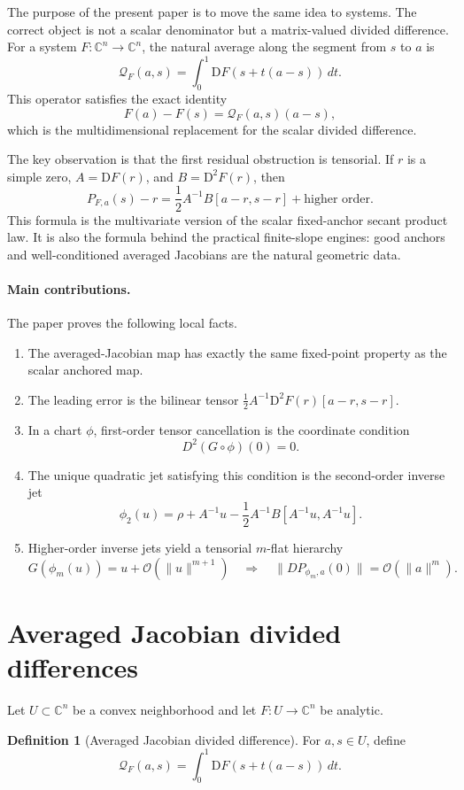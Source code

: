 \documentclass[11pt]{article}
\theoremstyle{definition}
\newtheorem{definition}[theorem]{Definition}
\newcommand{\C}{\mathbb C}
\newcommand{\D}{\mathrm D}
\newcommand{\Q}{\mathcal Q}
\newcommand{\Oterm}{\mathcal O}
\begin{document}
The purpose of the present paper is to move the same idea to systems. The correct object is not a scalar denominator but a matrix-valued divided difference. For a system $F:\C^n\to\C^n$, the natural average along the segment from $s$ to $a$ is
\[
\Q_F(a,s)=\int_0^1 \D F(s+t(a-s))\,dt.
\]
This operator satisfies the exact identity
\[
F(a)-F(s)=\Q_F(a,s)(a-s),
\]
which is the multidimensional replacement for the scalar divided difference.

The key observation is that the first residual obstruction is tensorial. If $r$ is a simple zero, $A=\D F(r)$, and $B=\D^2F(r)$, then
\[
P_{F,a}(s)-r=\frac12 A^{-1}B[a-r,s-r]+\text{higher order}.
\]
This formula is the multivariate version of the scalar fixed-anchor secant product law. It is also the formula behind the practical finite-slope engines: good anchors and well-conditioned averaged Jacobians are the natural geometric data.

\paragraph{Main contributions.}
The paper proves the following local facts.
\begin{enumerate}[label=(\roman*)]
\item The averaged-Jacobian map has exactly the same fixed-point property as the scalar anchored map.
\item The leading error is the bilinear tensor $\frac12 A^{-1}\D^2F(r)[a-r,s-r]$.
\item In a chart $\phi$, first-order tensor cancellation is the coordinate condition
\[
D^2(G\circ\phi)(0)=0.
\]
\item The unique quadratic jet satisfying this condition is the second-order inverse jet
\[
\phi_2(u)=\rho+A^{-1}u-\frac12 A^{-1}B[A^{-1}u,A^{-1}u].
\]
\item Higher-order inverse jets yield a tensorial $m$-flat hierarchy
\[
G(\phi_m(u))=u+\Oterm(\|u\|^{m+1})
\quad\Longrightarrow\quad
\|DP_{\phi_m,a}(0)\|=\Oterm(\|a\|^m).
\]
\end{enumerate}

\section{Averaged Jacobian divided differences}

Let $U\subset\C^n$ be a convex neighborhood and let $F:U\to\C^n$ be analytic.

\begin{definition}[Averaged Jacobian divided difference]
For $a,s\in U$, define
\begin{equation}\label{eq:Q}
\Q_F(a,s)=\int_0^1 \D F(s+t(a-s))\,dt.
\end{equation}
\end{definition}
\end{document}
